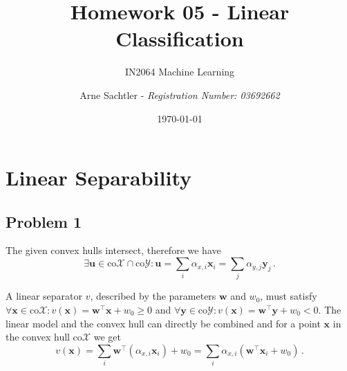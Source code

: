 \documentclass{scrartcl}
\title{Homework 05 - Linear Classification}
\author{Arne Sachtler - \textit{Registration Number: 03692662}}
\date{\today}
\subtitle{IN2064 Machine Learning}
\begin{document}
\maketitle

\section{Linear Separability}
\subsection{Problem 1}

The given convex hulls intersect, therefore we have 
\begin{equation}
	\exists \mathbf{u} \in \text{co}\mathcal{X} \cap \text{co}\mathcal{Y} : \mathbf{u} = \sum_i \alpha_{x,i} \mathbf{x}_i = \sum_j \alpha_{y,j} \mathbf{y}_j \, .
\end{equation}

A linear separator $v$, described by the parameters $\mathbf{w}$ and $w_0$, must satisfy $\forall \mathbf{x} \in \text{co}\mathcal{X}: v(\mathbf{x}) = \mathbf{w}^\top \mathbf{x}+ w_0 \ge 0$ and  $\forall \mathbf{y} \in \text{co} \mathcal{Y}: v(\mathbf{x}) = \mathbf{w}^\top \mathbf{y} + w_0 < 0$.
The linear model and the convex hull can directly be combined and for a point $\mathbf{x}$ in the convex hull $\text{co}\mathcal{X}$ we get
\begin{equation}
	v(\mathbf{x}) = \sum_i \mathbf{w}^\top (\alpha_{x,i} \mathbf{x}_i) + w_0 = \sum_i \alpha_{x,i} \left(\mathbf{w}^\top \mathbf{x}_i + w_0\right) \, .
\end{equation}
\end{document}
